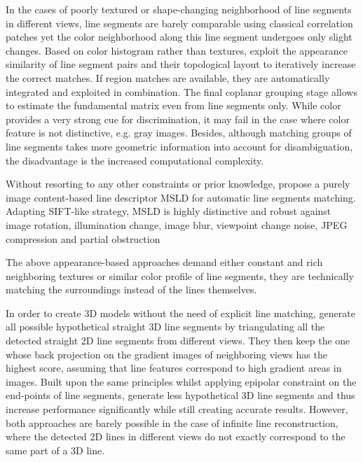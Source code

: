 In the cases of poorly textured or shape-changing neighborhood of line segments in different views, line segments are barely comparable using classical correlation patches yet the color neighborhood along this line segment undergoes only slight changes. Based on color histogram rather than textures, \citeauthor{BayJun2005} exploit the appearance similarity of line segment pairs and their topological layout to iteratively increase the correct matches. If region matches are available, they are automatically integrated and exploited in combination. The final coplanar grouping stage allows to estimate the fundamental matrix even from line segments only. While color provides a very strong cue for discrimination, it may fail in the case where color feature is not distinctive, e.g. gray images. Besides, although matching groups of line segments takes more geometric information into account for disambiguation, the disadvantage is the increased computational complexity.

Without resorting to any other constraints or prior knowledge, \citeauthor{WangMay2009} propose a purely image content-based line descriptor MSLD for automatic line segments matching. Adapting SIFT-like strategy, MSLD is highly distinctive and robust against image rotation, illumination change, image blur, viewpoint change noise, JPEG compression and partial obstruction \cite{WangMay2009}

The above appearance-based approaches demand either constant and rich neighboring textures or similar color profile of line segments, they are technically matching the surroundings instead of the lines themselves. \cite{JainJun2010,HoferFeb2013,TaylorNov1995}

In order to create 3D models without the need of explicit line matching, \citeauthor{JainJun2010} generate all possible hypothetical straight 3D line segments by triangulating all the detected straight 2D line segments from different views. They then keep the one whose back projection on the gradient images of neighboring views has the highest score, assuming that line features correspond to high gradient areas in images. Built upon the same principles whilst applying epipolar constraint on the end-points of line segments, \citeauthor{HoferFeb2013} generate less hypothetical 3D line segments and thus increase performance significantly while still creating accurate results. However, both approaches are barely possible in the case of infinite line reconstruction, where the detected 2D lines in different views do not exactly correspond to the same part of a 3D line.

